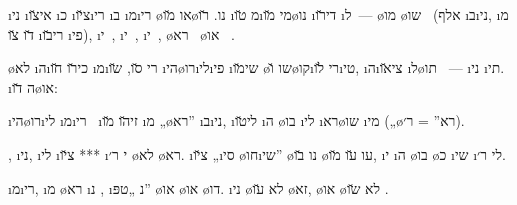 \i{ני} \i{אי}\u{צו}  \i{כ}  \i{צ}\u{יו}\i{רי} \i{ב}  \i{מ}\i{רי}  \o{או} \u{מו}\o{נו}.  \u{רו} \i{מ} \u{טו}\i{מי} \u{מו}\o{נו} \i{די}\u{רו}  \i{ל}~— \o{מו}  \o{שו}~ (אלף \i{ב}\i{ני}, \i{מ} \u{דו} \u{צו} \i{רי}\u{בו} \i{פי}), \i{י}~, \i{י}~, \i{י}~, \o{רא}~ \o{או} ~.

 \o{לא} \i{ה}\i{כי}\u{רו}  \u{חו}  \i{מ}\i{רי} \u{סו}, \u{שו} \i{הי}\o{רו}\i{לי}\i{פי} \i{שי}\u{מו} \o{שו} \u{ו}\o{קו}\i{רי} \u{לו}\i{טי}, \i{ה}\i{צי}\u{או}     \i{ל}\o{תו}   ~— \i{ני} \i{תי}. \i{ה}  \u{דו}\o{או}:

 \i{הי}\o{רו}\i{לי} \i{מ}\i{רי}~  \i{זי}\u{הו} \u{מו}  \i{מ} „\o{רא}” \i{ב}\i{ני}, \i{לי}\u{טו} \i{ה} \o{בו}     \i{לי} \i{רא}\o{שו}  \i{מי} („\o{רא}” = ר׳).

,  \i{ני}, \i{לי}  \i{צ}\u{יו} *** \i{י} ר׳ \o{לא} \o{רא}. \i{צ}\u{יו}  „\i{סי} \o{חו}\i{שי}” \o{נו} \u{בו} \o{עו} \u{עו} \u{מו},  \i{י} \i{ה} \o{בו} \o{כ}  \i{שי}   \i{לי} ר׳.

\i{מ}\i{רי}, \i{מ} \o{רא} \i{נ}  , \i{נ}  „טפּ” \o{או} \o{או} \o{דו}.  \i{ני} \o{לא} \u{עו} \o{זא}, \o{או}  \o{לא}  \u{שו} .

